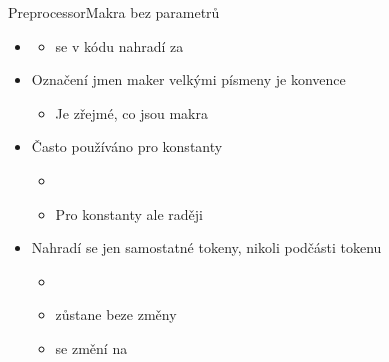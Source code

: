 \begin{frame}{Preprocessor}{Makra bez parametrů}

  \begin{itemize}
    \item {}
    \begin{itemize}
      \item {} se v kódu nahradí za 
    \end{itemize}

    \pause

    \item Označení jmen maker velkými písmeny je konvence
    \begin{itemize}
      \item Je zřejmé, co jsou makra
    \end{itemize}

    \pause

    \item Často používáno pro konstanty
    \begin{itemize}
      \item {}

      \pause

      \item Pro konstanty ale raději 
    \end{itemize}

    \pause

    \item Nahradí se jen samostatné tokeny, nikoli podčásti tokenu
    \begin{itemize}
      \item {}

      \pause

      \item {} zůstane beze změny

      \pause

      \item {} se změní na 

    \end{itemize}

  \end{itemize}

\end{frame}

